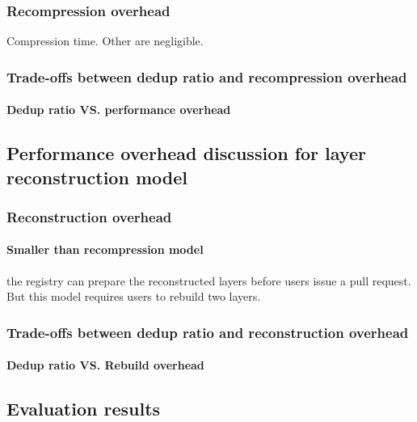 \subsubsection{Recompression overhead} Compression time. Other are negligible. 

\subsubsection{Trade-offs between dedup ratio and recompression overhead}

\paragraph{Dedup ratio VS. performance overhead}

\subsection{Performance overhead discussion for layer reconstruction model}

\subsubsection{Reconstruction overhead}

\paragraph{Smaller than recompression model} the registry can prepare the reconstructed layers before users issue a pull request. But this model requires users to rebuild two layers.

\subsubsection{Trade-offs between dedup ratio and reconstruction overhead}

\paragraph{Dedup ratio VS. Rebuild overhead}

\subsection{Evaluation results}